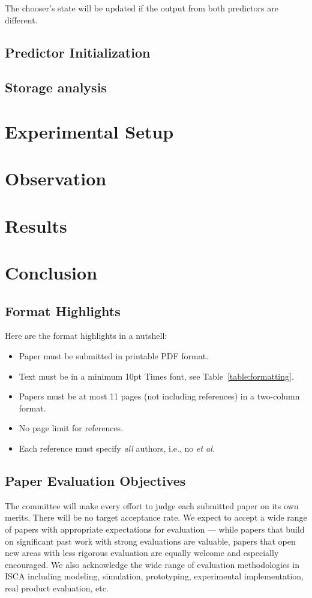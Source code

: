 \documentclass[conference]{IEEEtran}
\begin{document}
The chooser's state will be updated if the output from both predictors are different.

\subsection{Predictor Initialization}

\subsection{Storage analysis}

\section{Experimental Setup}

\section{Observation}

\section{Results}

\section{Conclusion}

\subsection{Format Highlights}

Here are the format highlights in a nutshell:
\begin{itemize}
\item Paper must be submitted in printable PDF format.
\item Text must be in a minimum 10pt Times font, see Table~\ref{table:formatting}.
\item Papers must be at most 11 pages (not including references) in a
  two-column format.
\item No page limit for references.
\item Each reference must specify {\em all} authors, i.e., no {\em et al.}
\end{itemize}

\subsection{Paper Evaluation Objectives} 
The committee will make every effort to judge each submitted paper on
its own merits. There will be no target acceptance rate. We expect to
accept a wide range of papers with appropriate expectations for
evaluation --- while papers that build on significant past work with
strong evaluations are valuable, papers that open new areas with less
rigorous evaluation are equally welcome and especially encouraged. We
also acknowledge the wide range of evaluation methodologies in ISCA including
modeling, simulation, prototyping, experimental implementation, real
product evaluation, etc. 
\end{document}
